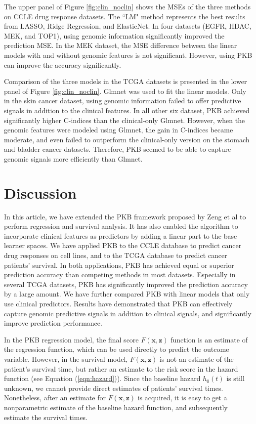 \documentclass[a4paper,12pt]{article}
\newcommand{\bd}[1]{\mathbf{#1}}
\begin{document}
The upper panel of Figure \ref{fig:clin_noclin} shows the MSEs of the three methods on CCLE drug response datasets. The ``LM" method represents the best results from LASSO, Ridge Regression, and ElasticNet. In four datasets (EGFR, HDAC, MEK, and TOP1), using genomic information significantly improved the prediction MSE. In the MEK dataset, the MSE difference between the linear models with and without genomic features is not significant. However, using PKB can improve the accuracy significantly.

Comparison of the three models in the TCGA datasets is presented in the lower panel of Figure \ref{fig:clin_noclin}. Glmnet was used to fit the linear models. Only in the skin cancer dataset, using genomic information failed to offer predictive signals in addition to the clinical features. In all other six dataset, PKB achieved significantly higher C-indices than the clinical-only Glmnet. However, when the genomic features were modeled using Glmnet, the gain in C-indices became moderate, and even failed to outperform the clinical-only version on the stomach and bladder cancer datasets. Therefore, PKB seemed to be able to capture genomic signals more efficiently than Glmnet.

\section{Discussion}
In this article, we have extended the PKB framework proposed by  Zeng et al\cite{zeng2019pathway} to perform regression and survival analysis. It has also enabled the algorithm to incorporate clinical features as predictors by adding a linear part to the base learner spaces. We have applied PKB to the CCLE database to predict cancer drug responses on cell lines, and to the TCGA database to predict cancer patients' survival. In both applications, PKB has achieved equal or superior prediction accuracy than competing methods in most datasets. Especially in several TCGA datasets, PKB has significantly improved the prediction accuracy by a large amount. We have further compared PKB with linear models that only use clinical predictors. Results have demonstrated that PKB can effectively capture genomic predictive signals in addition to clinical signals, and significantly improve prediction performance.

In the PKB regression model, the final score $F(\bd{x}, \bd{z})$ function is an estimate of the regression function, which can be used directly to predict the outcome variable. However, in the survival model, $F(\bd{x}, \bd{z})$ is not an estimate of the patient's survival time, but rather an estimate to the risk score in the hazard function (see Equation (\ref{eqn:hazard})). Since the baseline hazard $h_0(t)$ is still unknown, we cannot provide direct estimates of patients' survival times. Nonetheless, after an estimate for $F(\bd{x}, \bd{z})$ is acquired, it is easy to get a nonparametric estimate of the baseline hazard function, and subsequently estimate the survival times.
\end{document}
